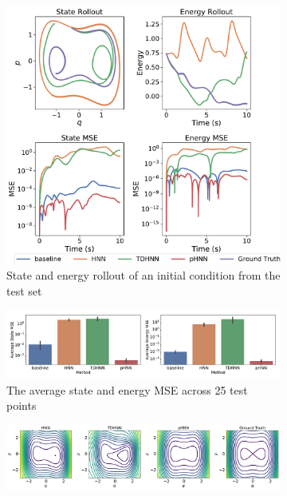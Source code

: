\documentclass[twoside]{article}
\begin{document}
\begin{figure}[!htb]
\centering
\captionsetup{justification=centering}
\begin{subfigure}[b]{0.48\textwidth}
\includegraphics[width=\textwidth]{figures/figures/duffing/1/duffing_long_0.pdf}
\caption{State and energy rollout of an initial condition from the test set}
\end{subfigure}
\begin{subfigure}[b]{0.48\textwidth}
\includegraphics[width=\textwidth]{figures/figures/duffing/1/duffing_errors_0.pdf}
\caption{The average state and energy MSE across 25 test points}
\end{subfigure}
\begin{subfigure}[b]{0.48\textwidth}
\includegraphics[width=\textwidth]{figures/figures/duffing/1/duffing_hamiltonian_0.pdf}

\end{subfigure}
\end{figure}
\end{document}
